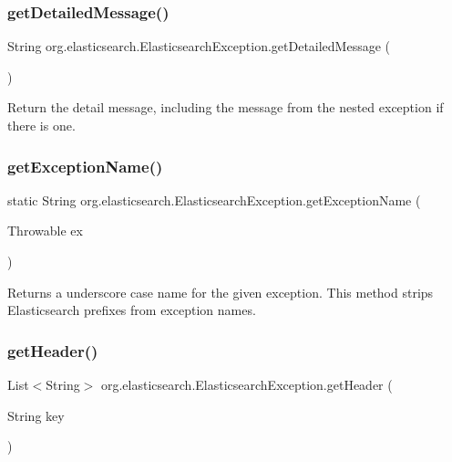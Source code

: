 \subsubsection{\texorpdfstring{get\+Detailed\+Message()}{getDetailedMessage()}}
{\footnotesize\ttfamily String org.\+elasticsearch.\+Elasticsearch\+Exception.\+get\+Detailed\+Message (\begin{DoxyParamCaption}{ }\end{DoxyParamCaption})}

Return the detail message, including the message from the nested exception if there is one. \hypertarget{classorg_1_1elasticsearch_1_1_elasticsearch_exception_ac4f280f6f47ba5ba899ab0ec859253c3}{}\label{classorg_1_1elasticsearch_1_1_elasticsearch_exception_ac4f280f6f47ba5ba899ab0ec859253c3} 
\subsubsection{\texorpdfstring{get\+Exception\+Name()}{getExceptionName()}}
{\footnotesize\ttfamily static String org.\+elasticsearch.\+Elasticsearch\+Exception.\+get\+Exception\+Name (\begin{DoxyParamCaption}\item[{Throwable}]{ex }\end{DoxyParamCaption})\hspace{0.3cm}{\ttfamily [static]}}

Returns a underscore case name for the given exception. This method strips {\ttfamily Elasticsearch} prefixes from exception names. \hypertarget{classorg_1_1elasticsearch_1_1_elasticsearch_exception_ac5c7fe2597ce0b363d433503b23a1181}{}\label{classorg_1_1elasticsearch_1_1_elasticsearch_exception_ac5c7fe2597ce0b363d433503b23a1181} 
\subsubsection{\texorpdfstring{get\+Header()}{getHeader()}}
{\footnotesize\ttfamily List$<$String$>$ org.\+elasticsearch.\+Elasticsearch\+Exception.\+get\+Header (\begin{DoxyParamCaption}\item[{String}]{key }\end{DoxyParamCaption})}

